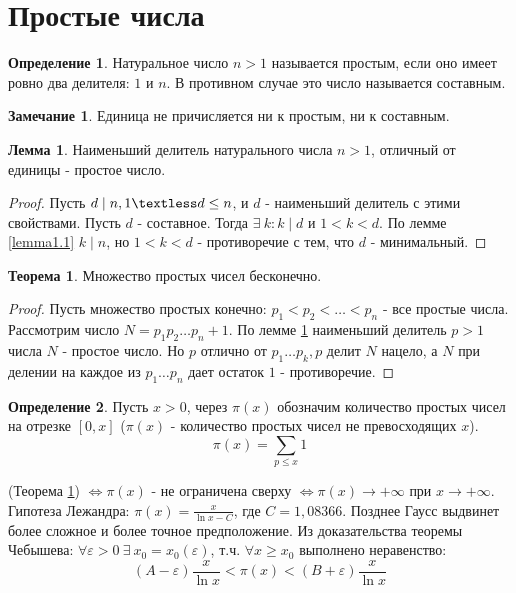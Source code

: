 \documentclass[a4paper, 12pt]{article}
\renewcommand{\epsilon}{\varepsilon}
\newcommand{\lra}{\Leftrightarrow}
\renewcommand{\div}{\mid}
\theoremstyle{definition}
\newtheorem{definition}{Определение}[section]
\newtheorem{theorem}{Теорема}[section]
\newtheorem{lemma}{Лемма}[section]
\newtheorem*{comm}{Замечание}
\begin{document}
    \section{Простые числа}
    \begin{definition}
        Натуральное число $n>1$ называется простым, если оно имеет ровно два делителя: $1$ и $n$. В противном случае это число называется составным.
    \end{definition}
    \begin{comm}
        Единица не причисляется ни к простым, ни к составным.
    \end{comm}
    \begin{lemma} \label{lemma5.1}
        Наименьший делитель натурального числа $n>1$, отличный от единицы - простое число.
    \end{lemma} 
    \begin{proof}
        Пусть $d\div n, 1 \textless d \leq n$, и $d$ - наименьший делитель с этими свойствами. Пусть $d$ - составное. Тогда $\exists\ k: k\div d$ и $1<k<d$. По лемме \ref{lemma1.1} $k\div n$, но $1<k<d$ - противоречие с тем, что $d$ - минимальный.
    \end{proof} 
    \begin{theorem} \label{th5.1}
        Множество простых чисел бесконечно.
    \end{theorem}
    \begin{proof}
        Пусть множество простых конечно: $p_1<p_2<\dots<p_n$ - все простые числа. Рассмотрим число $N = p_1p_2\dots p_n+1$. По лемме \ref{lemma5.1} наименьший делитель $p>1$ числа $N$ - простое число. Но $p$ отлично от $p_1\dots p_k, p$ делит $N$ нацело, а $N$ при делении на каждое из $p_1\dots p_n$ дает остаток $1$ - противоречие.
    \end{proof} 
    \begin{definition}
        Пусть $x>0$, через $\pi(x)$ обозначим количество простых чисел на отрезке $[0, x]$ ($\pi(x)$ - количество простых чисел не превосходящих $x$).
    $$\pi(x)=\sum\limits_{p\leq x}1$$
    \end{definition} 
    (Теорема \ref{th5.1}) $\lra \pi(x)$ - не ограничена сверху $\lra \pi(x)\to +\infty$ при $x\to +\infty$.\\
    Гипотеза Лежандра: $\pi(x)=\frac{x}{\ln x-C}$, где $C=1,08366$. Позднее Гаусс выдвинет более сложное и более точное предположение.
    Из доказательства теоремы Чебышева: $\forall \epsilon >0\ \exists\ x_0=x_0(\epsilon)$, т.ч. $\forall x\geq x_0$ выполнено неравенство:
    $$(A-\epsilon)\frac{x}{\ln x}<\pi(x)<(B+\epsilon)\frac{x}{\ln x}$$
\end{document}
